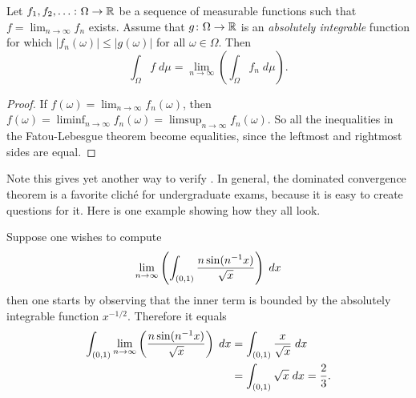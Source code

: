 \begin{corollary}
	Let $f_1, f_2, \dots \colon \Omega \to \mathbb R$
	be a sequence of measurable functions
	such that $f = \lim_{n \to \infty} f_n$ exists.
	Assume that $g \colon \Omega \to \mathbb R$ is an
	\emph{absolutely integrable} function for which
	$|f_n(\omega)| \le |g(\omega)|$ for all $\omega \in \Omega$.
	Then
	\[ \int_\Omega f \; d \mu
		= \lim_{n \to \infty} \left( \int_\Omega f_n \; d\mu \right). \]
\end{corollary}
\begin{proof}
	If $f(\omega) = \lim_{n \to \infty} f_n(\omega)$,
	then $f(\omega) = \liminf_{n \to \infty} f_n(\omega)
	= \limsup_{n \to \infty} f_n(\omega)$.
	So all the inequalities in the Fatou-Lebesgue theorem
	become equalities, since the leftmost and rightmost sides are equal.
\end{proof}
Note this gives yet another way to verify .
In general, the dominated convergence theorem
is a favorite clich\'{e} for undergraduate exams,
because it is easy to create questions for it.
Here is one example showing how they all look.
\begin{example}
	Suppose one wishes to compute
	\[ \lim_{n \to \infty}
		\left( \int_{(0,1)} \frac{n\sin(n^{-1} x)}{\sqrt x} \right) \; dx \]
	then one starts by observing that
	the inner term is bounded by the absolutely integrable function $x^{-1/2}$.
	Therefore it equals
	\begin{align*}
		\int_{(0,1)} \lim_{n \to \infty}
			\left( \frac{n\sin(n^{-1} x)}{\sqrt x} \right) \; dx
		&= \int_{(0,1)} \frac{x}{\sqrt x} \; dx \\
		&= \int_{(0,1)} \sqrt{x} \; dx = \frac23.
	\end{align*}
\end{example}



\section{\problemhead}

